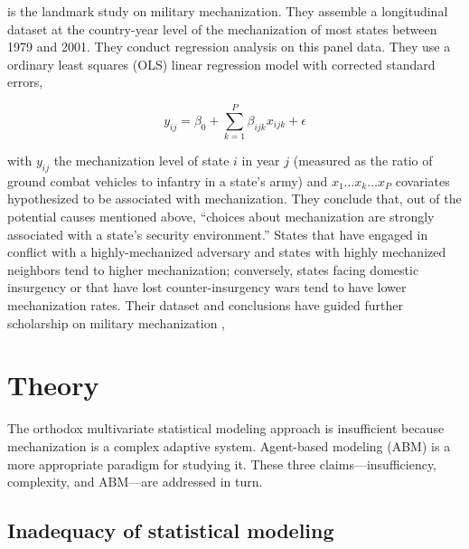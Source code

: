 \documentclass{article}
\begin{document}
\citet{sechser2010army} is the landmark study on military mechanization. They
assemble a longitudinal dataset at the country-year level of the mechanization
of most states between 1979 and 2001. They conduct regression analysis on this
panel data. They use a ordinary least squares (OLS) linear regression model with corrected standard
errors,

\begin{equation}
	y_{ij} = \beta_0 + \sum_{k=1}^P \beta_{ijk}x_{ijk} + \epsilon
\end{equation}

with $y_{ij}$ the mechanization level of state $i$ in year $j$ (measured as the 
ratio of ground combat vehicles to infantry in a state's army) and $x_1 \ldots
x_k \ldots x_{P}$ covariates hypothesized to be associated with
mechanization. They conclude that, out of the
potential causes mentioned above, ``choices about
mechanization are strongly associated with a state's security environment.''
States that have engaged in conflict with a highly-mechanized adversary and states
with highly mechanized neighbors tend to higher mechanization; conversely, states facing
domestic insurgency or that have lost counter-insurgency wars tend to have lower
mechanization rates. Their dataset and conclusions have guided further scholarship on military
mechanization \citep[e.g.][]{pilster2012democracies}, 

\section{Theory}

The orthodox multivariate statistical modeling approach is insufficient because
mechanization is a complex adaptive system. Agent-based modeling (ABM) is a more 
appropriate paradigm for studying it. These three
claims---insufficiency, complexity, and ABM---are addressed in turn. 

\subsection{Inadequacy of statistical modeling}
\end{document}
